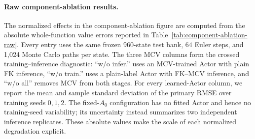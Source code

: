\paragraph{Raw component-ablation results.}
The normalized effects in the component-ablation figure are computed from the
absolute whole-function value errors reported in
Table~\ref{tab:component-ablation-raw}.  Every entry uses the same frozen
960-state test bank, 64 Euler steps, and 1,024 Monte Carlo paths per state.
The three MCV columns form the crossed training--inference diagnostic: ``w/o
infer.'' uses an MCV-trained Actor with plain FK inference, ``w/o train.'' uses
a plain-label Actor with FK--MCV inference, and ``w/o all'' removes MCV from
both stages.  For every learned-Actor column, we report the mean and sample
standard deviation of the primary RMSE over training seeds $0,1,2$.  The
fixed-$A_0$ configuration has no fitted Actor and hence no training-seed
variability; its uncertainty instead summarizes two independent inference
replicates.  These absolute values make the scale of each normalized
degradation explicit.

